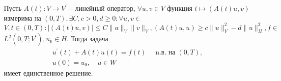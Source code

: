\begin{theorem}
    \label{th:1_5:7}\cite[426]{Zeidler1990a}
    Пусть $A(t): V \rightarrow V^{\prime}$ -- линейный оператор,
    $\forall u, v \in V$ функция $t \mapsto(A(t) u, v)$
    измерима на $(0, T), \exists C, c>0, d \geq 0:
    \forall u, v \in$ $V, t \in(0, T):|(A(t) u, v)|
    \leq C\|u\|_{V}\|v\|_{V},(A(t) u, u)
    \geq c\|u\|_{V}^{2}-d\|u\|_{H}^{2},
    f \in$ $L^{2}\left(0, T ; V^{\prime}\right), u_{0} \in H$.
    Тогда задача
    \[
        \begin{gathered}
            u^{\prime}(t)+A(t) u(t)=f(t) \quad \text { n.в. на }(0, T),\\
            u(0)=u_{0}, \quad u \in W
        \end{gathered}
    \]
    имеет единственное решение.
\end{theorem}
